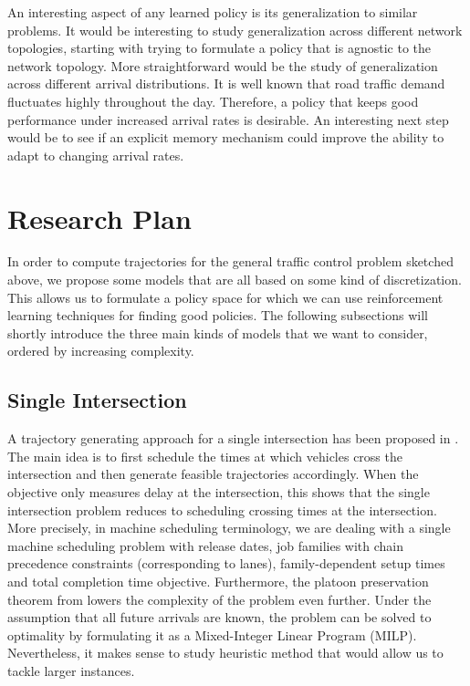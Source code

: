 \documentclass{article}
\theoremstyle{definition}
\theoremstyle{plain}
\begin{document}

An interesting aspect of any learned policy is its generalization to similar
problems. It would be interesting to study generalization across different
network topologies, starting with trying to formulate a policy that is agnostic
to the network topology. More straightforward would be the study of
generalization across different arrival distributions. It is well known that
road traffic demand fluctuates highly throughout the day. Therefore, a policy
that keeps good performance under increased arrival rates is desirable. An
interesting next step would be to see if an explicit memory mechanism could
improve the ability to adapt to changing arrival rates.


\section{Research Plan}

In order to compute trajectories for the general traffic control problem
sketched above, we propose some models that are all based on some kind of
discretization. This allows us to formulate a policy space for which we can use
reinforcement learning techniques for finding good policies. The following
subsections will shortly introduce the three main kinds of models that we want
to consider, ordered by increasing complexity.


\subsection{Single Intersection}


A trajectory generating approach for a single intersection has been proposed in
\cite{timmermanPlatoonFormingAlgorithms2021}. The main idea is to first schedule the times at which vehicles
cross the intersection and then generate feasible trajectories accordingly. When
the objective only measures delay at the intersection, this shows that the
single intersection problem reduces to scheduling crossing times at the
intersection. More precisely, in machine scheduling terminology, we are dealing
with a single machine scheduling problem with release dates, job families with
chain precedence constraints (corresponding to lanes), family-dependent setup
times and total completion time objective. Furthermore, the platoon preservation
theorem from \cite{limpensOnlinePlatoonForming2023} lowers the complexity of the problem even further.
Under the assumption that all future arrivals are known, the problem can be
solved to optimality by formulating it as a Mixed-Integer Linear Program (MILP).
Nevertheless, it makes sense to study heuristic method that would allow us to
tackle larger instances.
\end{document}
